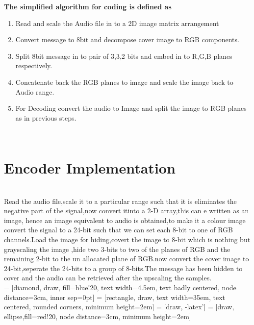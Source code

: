 \documentclass[a4paper, 12pt, notitlepage]{report}
\begin{document}
\begin{block}{\textbf{The simplified algorithm for coding is defined as}}
\begin{enumerate}
  \item {
    
Read and scale the Audio file in to a 2D image matrix arrangement
  
  }
	\item {
		Convert message to 8bit and decompose cover image to RGB components. 

  }
	\item {
    Split 8bit message in to pair of 3,3,2 bits and embed in to R,G,B planes respectively. 
}
\item Concatenate back the RGB planes to image and scale the image back to Audio range.

\item For Decoding convert the audio to Image and split the image to RGB planes as in previous steps. 

  \end{enumerate}
\end{block}\\

\section{Encoder Implementation}
\\
Read the audio file,scale it to a particular range such that it is eliminates the negative part of the signal,now convert itinto a 2-D array,this can e written as an image, hence an image equivalent to audio is obtained,to make it a colour image convert the signal to a 24-bit such that we can set each 8-bit to one of RGB channels.Load the image for hiding,covert the image to 8-bit which is nothing but grayscaling the image ,hide two 3-bits to two of the planes of RGB and the remaining 2-bit to the un allocated plane of RGB.now convert the cover image to 24-bit,seperate the 24-bits to a group of 8-bits.The message has been hidden to cover and the audio can be retrieved after the upscaling the samples.\\

 = [diamond, draw, fill=blue!20, 
    text width=4.5em, text badly centered, node distance=3cm, inner sep=0pt]
 = [rectangle, draw,
    text width=35em, text centered, rounded corners, minimum height=2em]
 = [draw, -latex']
 = [draw, ellipse,fill=red!20, node distance=3cm,
    minimum height=2em]
\end{document}
